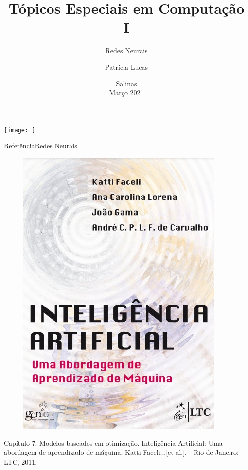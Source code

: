 \documentclass[t]{beamer}
\title[]{Tópicos Especiais em Computação I}
\subtitle[]{Redes Neurais}
\author[]{Patrícia Lucas\\{\footnotesize }}
\institute{Bacharelado em Sistemas de Informação \\ IFNMG  - Campus Salinas}
\date{\scriptsize Salinas\\Março 2021}
\begin{document}
\begin{frame}

\begin{center}
\texttt{[image: ]}
\end{center}
  \titlepage
\end{frame}


\begin{ftst}{Referência}{Redes Neurais}
\begin{figure}
    \includegraphics[scale=0.35]{Figuras/slide01_11.jpg}
\end{figure}
Capítulo 7: Modelos baseados em otimização.
\vone
\scriptsize
Inteligência Artificial: Uma abordagem de aprendizado de máquina. Katti Faceli...[et al.]. - Rio de Janeiro: LTC, 2011.

\end{ftst}
\end{document}
